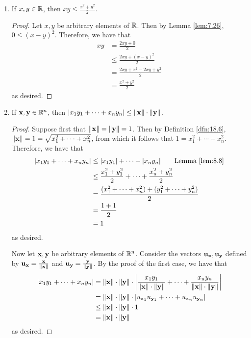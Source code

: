 \documentclass[../main.tex]{subfiles}
\begin{document}
\begin{lemma}\label{lem:18.9}
    \leavevmode
    \begin{enumerate}[label=\textup{(}\alph*\textup{)}]
        \item If $x,y\in\mathbb{R}$, then $xy\leq\frac{x^2+y^2}{2}$.
        \begin{proof}
            Let $x,y$ be arbitrary elements of $\mathbb{R}$. Then by Lemma \ref{lem:7.26}, $0\leq(x-y)^2$. Therefore, we have that
            \begin{align*}
                xy &= \frac{2xy+0}{2}\\
                &\leq \frac{2xy+(x-y)^2}{2}\\
                &= \frac{2xy+x^2-2xy+y^2}{2}\\
                &= \frac{x^2+y^2}{2}
            \end{align*}
            as desired.
        \end{proof}
        \item If $\mathbf{x},\mathbf{y}\in\mathbb{R}^n$, then $|x_1y_1+\cdots+x_ny_n|\leq\norm{\mathbf{x}}\cdot\norm{\mathbf{y}}$.
        \begin{proof}
            Suppose first that $\norm{\mathbf{x}}=\norm{\mathbf{y}}=1$. Then by Definition \ref{dfn:18.6}, $\norm{\mathbf{x}}=1=\sqrt{x_1^2+\cdots+x_n^2}$, from which it follows that $1=x_1^2+\cdots+x_n^2$. Therefore, we have that
            \begin{align*}
                |x_1y_1+\cdots+x_ny_n| &\leq |x_1y_1|+\cdots+|x_ny_n|\tag*{Lemma \ref{lem:8.8}}\\
                &\leq \frac{x_1^2+y_1^2}{2}+\cdots+\frac{x_n^2+y_n^2}{2}\\
                &= \frac{(x_1^2+\cdots+x_n^2)+(y_1^2+\cdots+y_n^2)}{2}\\
                &= \frac{1+1}{2}\\
                &= 1
            \end{align*}
            as desired.\par
            Now let $\mathbf{x},\mathbf{y}$ be arbitrary elements of $\mathbb{R}^n$. Consider the vectors $\mathbf{u}_{\mathbf{x}},\mathbf{u}_{\mathbf{y}}$ defined by $\mathbf{u}_{\mathbf{x}}=\frac{\mathbf{x}}{\norm{\mathbf{x}}}$ and $\mathbf{u}_{\mathbf{y}}=\frac{\mathbf{y}}{\norm{\mathbf{y}}}$. By the proof of the first case, we have that
            \begin{align*}
                |x_1y_1+\cdots+x_ny_n| &= \norm{\mathbf{x}}\cdot\norm{\mathbf{y}}\cdot\left| \frac{x_1y_1}{\norm{\mathbf{x}}\cdot\norm{\mathbf{y}}}+\cdots+\frac{x_ny_n}{\norm{\mathbf{x}}\cdot\norm{\mathbf{y}}} \right|\\
                &= \norm{\mathbf{x}}\cdot\norm{\mathbf{y}}\cdot|u_{\mathbf{x}_1}u_{\mathbf{y}_1}+\cdots+u_{\mathbf{x}_n}u_{\mathbf{y}_n}|\\
                &\leq \norm{\mathbf{x}}\cdot\norm{\mathbf{y}}\cdot 1\\
                &= \norm{\mathbf{x}}\cdot\norm{\mathbf{y}}
            \end{align*}
            as desired.
        \end{proof}
    \end{enumerate}
\end{lemma}
\end{document}
